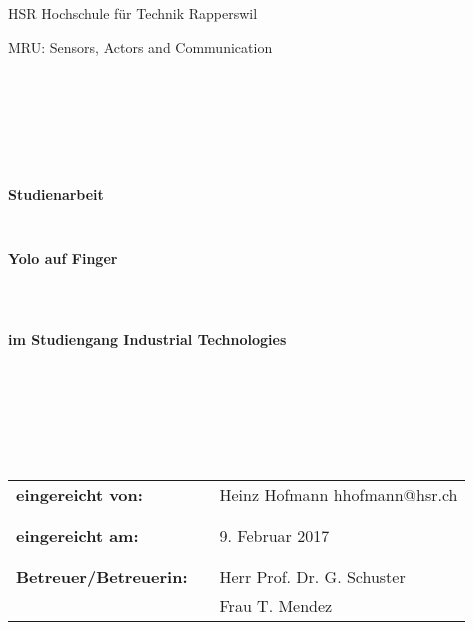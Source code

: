 
\thispagestyle{empty}
\begin{center}
\Large{HSR Hochschule für Technik Rapperswil}\\
\end{center}

\begin{center}
\Large{MRU: Sensors, Actors and Communication}
\end{center}
\begin{verbatim}







\end{verbatim}
\begin{center}
\textbf{\LARGE{Studienarbeit}}
\end{center}
\begin{verbatim}


\end{verbatim}
\begin{center}
\textbf{\Huge{Yolo auf Finger}}
\end{center}
\begin{verbatim}



\end{verbatim}
\begin{center}
\textbf{im Studiengang Industrial Technologies}
\end{center}
\begin{verbatim}







\end{verbatim}

\begin{flushleft}
\begin{tabular}{lll}
\textbf{eingereicht von:} & & Heinz Hofmann \flq{}hhofmann@hsr.ch\frq{}\\
& & \\
& & \\
\textbf{eingereicht am:} & & 9. Februar 2017\\
& & \\
& & \\
\textbf{Betreuer/Betreuerin:} & & Herr Prof. Dr. G. Schuster \\
& & Frau T. Mendez
\end{tabular}
\end{flushleft}









 
